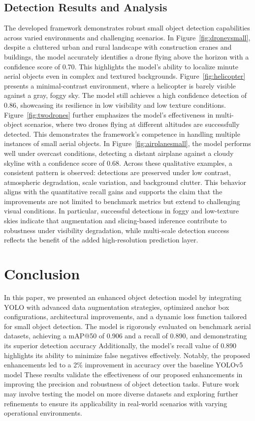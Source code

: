 \documentclass[preprint,review,12pt]{elsarticle}
\begin{document}
\subsection{Detection Results and Analysis}
The developed framework demonstrates robust small object detection capabilities across varied environments and challenging scenarios. In Figure~\ref{fig:dronevsmall}, despite a cluttered urban and rural landscape with construction cranes and buildings, the model accurately identifies a drone flying above the horizon with a confidence score of 0.70. This highlights the model’s ability to localize minute aerial objects even in complex and textured backgrounds. Figure~\ref{fig:helicopter} presents a minimal-contrast environment, where a helicopter is barely visible against a gray, foggy sky. The model still achieves a high confidence detection of 0.86, showcasing its resilience in low visibility and low texture conditions. Figure~\ref{fig:twodrones} further emphasizes the model’s effectiveness in multi-object scenarios, where two drones flying at different altitudes are successfully detected. This demonstrates the framework’s competence in handling multiple instances of small aerial objects. In Figure~\ref{fig:airplanesmall}, the model performs well under overcast conditions, detecting a distant airplane against a cloudy skyline with a confidence score of 0.68. Across these qualitative examples, a consistent pattern is observed: detections are preserved under low contrast, atmospheric degradation, scale variation, and background clutter. This behavior aligns with the quantitative recall gains and supports the claim that the improvements are not limited to benchmark metrics but extend to challenging visual conditions. In particular, successful detections in foggy and low-texture skies indicate that augmentation and slicing-based inference contribute to robustness under visibility degradation, while multi-scale detection success reflects the benefit of the added high-resolution prediction layer.


\section{Conclusion}
In this paper, we presented an enhanced object detection model by integrating YOLO with advanced data augmentation strategies, optimized anchor box configurations, architectural improvements, and a dynamic loss function tailored for small object detection. The model is rigorously evaluated on benchmark aerial datasets, achieving a mAP@50 of 0.906 and a recall of 0.890, and demonstrating its superior detection accuracy Additionally, the model's recall value of 0.890 highlights its ability to minimize false negatives effectively. Notably, the proposed enhancements led to a 2\% improvement in accuracy over the baseline YOLOv5 model
These results validate the effectiveness of our proposed enhancements in improving the precision and robustness of object detection tasks. Future work may involve testing the model on more diverse datasets and exploring further refinements to ensure its applicability in real-world scenarios with varying operational environments. 
\end{document}
